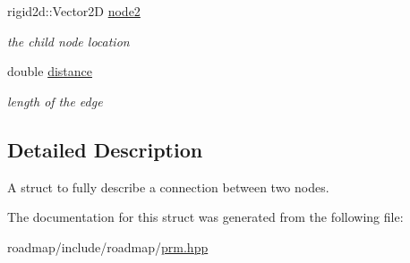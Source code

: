 \begin{DoxyCompactItemize}
\mbox{\label{structprm_1_1Edge_a3d555282fbb49f6cbaa37865ae09029c}} 
rigid2d\+::\+Vector2D \hyperlink{structprm_1_1Edge_a3d555282fbb49f6cbaa37865ae09029c}{node2}
\begin{DoxyCompactList}\small\item\em the child node location \end{DoxyCompactList}\item 
\mbox{\label{structprm_1_1Edge_a7f65f07649f06a87bc16514c75b9feb2}} 
double \hyperlink{structprm_1_1Edge_a7f65f07649f06a87bc16514c75b9feb2}{distance}
\begin{DoxyCompactList}\small\item\em length of the edge \end{DoxyCompactList}\end{DoxyCompactItemize}


\subsection{Detailed Description}
A struct to fully describe a connection between two nodes. 

The documentation for this struct was generated from the following file\+:\begin{DoxyCompactItemize}
\item 
roadmap/include/roadmap/\hyperlink{prm_8hpp}{prm.\+hpp}\end{DoxyCompactItemize}
